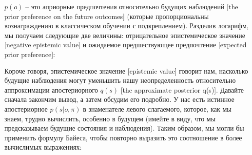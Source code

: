\documentclass[twoside,leqno, 11pt]{article}
\begin{document}
	\begin{figure}[h]
	\end{figure}
	
	\newpage
	
	$p(o)$ -- это априорные предпочтения относительно будущих наблюдений [the prior preference on the future outcomes] (которые пропорциональны вознаграждению в классическом обучении с подкреплением). Разделив логарифм, мы получаем следующие две величины:  отрицательное эпистемическое значение [negative epistemic value] и ожидаемое предшествующее предпочтение [expected prior preference]:
	
	
	\begin{figure}[h]
	\end{figure}
	
	Короче говоря, эпистемическое значение [epistemic value] говорит нам, насколько будущие наблюдения могут уменьшить нашу неопределенность относительно аппроксимации апостериорного $q(s)$ [the approximate posterior q(s)]. Давайте сначала закончим вывод, а затем обсудим его подробно. У нас есть истинное апостериорное $p(s|o,\pi)$ в знаменателе левого слагаемого, которое, как мы знаем, трудно вычислить, особенно в будущем (имейте в виду, что мы предсказываем будущие состояния и наблюдения). Таким образом, мы могли бы применить формулу Байеса, чтобы повторно выразить это соотношение в более вычислимых выражениях:
	
\end{document}
